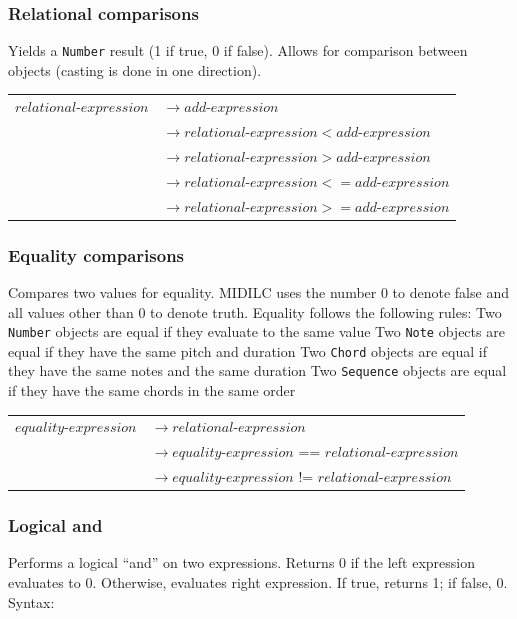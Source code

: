 \documentclass[12pt,A4]{book}
\begin{document}
\subsubsection{Relational comparisons}
Yields a \verb|Number| result (1 if true, 0 if false). Allows for comparison between objects (casting is done in one direction).

\begin{tabular}{l l}
$relational\mbox{-}expression$  & $\rightarrow add\mbox{-}expression$\\
& $\rightarrow relational\mbox{-}expression < add\mbox{-}expression$ \\
& $\rightarrow relational\mbox{-}expression > add\mbox{-}expression$ \\
& $\rightarrow relational\mbox{-}expression <= add\mbox{-}expression$ \\
& $\rightarrow relational\mbox{-}expression >= add\mbox{-}expression$ \\
\end{tabular}

\subsubsection{Equality comparisons}
Compares two values for equality. MIDILC uses the number 0 to denote false and all values other than 0 to denote truth. Equality follows the following rules:
Two \verb|Number| objects are equal if they evaluate to the same value
Two \verb|Note| objects are equal if they have the same pitch and duration
Two \verb|Chord| objects are equal if they have the same notes and the same duration
Two \verb|Sequence| objects are equal if they have the same chords in the same order

\begin{tabular}{l l}
$equality\mbox{-}expression$  & $\rightarrow relational\mbox{-}expression$\\
& $\rightarrow equality\mbox{-}expression$ == $relational\mbox{-}expression$\\
& $\rightarrow equality\mbox{-}expression$ != $relational\mbox{-}expression$\\
\end{tabular}

\subsubsection{Logical and}
Performs a logical ``and'' on two expressions. Returns 0 if the left expression evaluates to 0. Otherwise, evaluates right expression. If true, returns 1; if false, 0.
Syntax:
\end{document}
